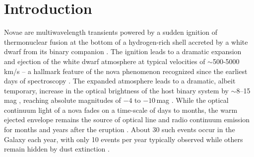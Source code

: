 \documentclass[a4paper,fleqn,usenatbib]{mnras}
\begin{document}



\section{Introduction}
\label{sec:intro}


Novae are multiwavelength transients powered by a sudden ignition of
thermonuclear fusion at the bottom of a hydrogen-rich shell accreted by 
a white dwarf from its binary companion \citep[e.g.][]{2008clno.book.....B,2016PASP..128e1001S,2020ApJ...895...70S,2020A&ARv..28....3D}. %
The ignition leads to a dramatic expansion and ejection of the white dwarf atmosphere at 
typical velocities of $\sim$500-5000\,km/s -- a hallmark feature of 
the nova phenomenon recognized since the earliest days of spectroscopy \citep{1895Obs....18..436P,1956VA......2.1477M,2020ApJ...905...62A}. 
The expanded atmosphere leads to a dramatic, albeit temporary, increase in the optical brightness of the host 
binary system by $\sim 8$--15\,mag \citep{1990ApJ...356..609V,2008clno.book.....W,2021ApJ...910..120K}, 
reaching absolute magnitudes of $-4$ to $-10$\,mag \citep{2017ApJ...834..196S,2009ApJ...690.1148S,2022MNRAS.517.6150S}.
While the optical continuum light of a nova fades on a time-scale of days to 
months, the warm ejected envelope remains the source of optical line and radio continuum 
emission for months and years after the eruption \citep{2010AJ....140...34S,2021ApJS..257...49C}.
%
About 30 such events occur in the Galaxy each year, 
with only 10 events per year typically observed while others remain hidden 
by dust extinction \citep{2017ApJ...834..196S,2021ApJ...912...19D,2022arXiv220614132K,2022arXiv220705689R}.
\end{document}
